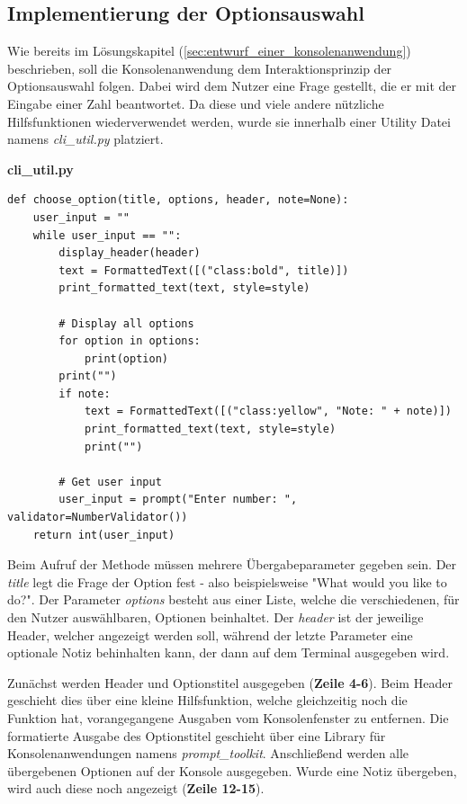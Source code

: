 \documentclass[oneside]{ausarbeitung}
\begin{document}
\subsection{Implementierung der Optionsauswahl}
\label{sub:implementierung_der_optionsauswahl}

Wie bereits im Lösungskapitel (\ref{sec:entwurf_einer_konsolenanwendung}) beschrieben, soll die Konsolenanwendung dem Interaktionsprinzip der Optionsauswahl folgen. Dabei wird dem Nutzer eine Frage gestellt, die er mit der Eingabe einer Zahl beantwortet. Da diese und viele andere nützliche Hilfsfunktionen wiederverwendet werden, wurde sie innerhalb einer Utility Datei namens \textit{cli\_util.py} platziert.

\lstset{language=Python}
\lstset{frame=lines}
\lstset{basicstyle=\footnotesize}
\textbf{cli\_util.py}
\begin{lstlisting}
def choose_option(title, options, header, note=None):
	user_input = ""
	while user_input == "":
		display_header(header)
		text = FormattedText([("class:bold", title)])
		print_formatted_text(text, style=style)

		# Display all options
		for option in options:
			print(option)
		print("")
		if note:
			text = FormattedText([("class:yellow", "Note: " + note)])
			print_formatted_text(text, style=style)
			print("")

		# Get user input
		user_input = prompt("Enter number: ", validator=NumberValidator())
	return int(user_input)
\end{lstlisting}

Beim Aufruf der Methode müssen mehrere Übergabeparameter gegeben sein. Der \textit{title} legt die Frage der Option fest - also beispielsweise "What would you like to do?". Der Parameter \textit{options} besteht aus einer Liste, welche die verschiedenen, für den Nutzer auswählbaren, Optionen beinhaltet. Der \textit{header} ist der jeweilige Header, welcher angezeigt werden soll, während der letzte Parameter eine optionale Notiz behinhalten kann, der dann auf dem Terminal ausgegeben wird.

Zunächst werden Header und Optionstitel ausgegeben (\textbf{Zeile 4-6}). Beim Header geschieht dies über eine kleine Hilfsfunktion, welche gleichzeitig noch die Funktion hat, vorangegangene Ausgaben vom Konsolenfenster zu entfernen. Die formatierte Ausgabe des Optionstitel geschieht über eine Library für Konsolenanwendungen namens \textit{prompt\_toolkit}. Anschließend werden alle übergebenen Optionen auf der Konsole ausgegeben. Wurde eine Notiz übergeben, wird auch diese noch angezeigt (\textbf{Zeile 12-15}).
\end{document}
